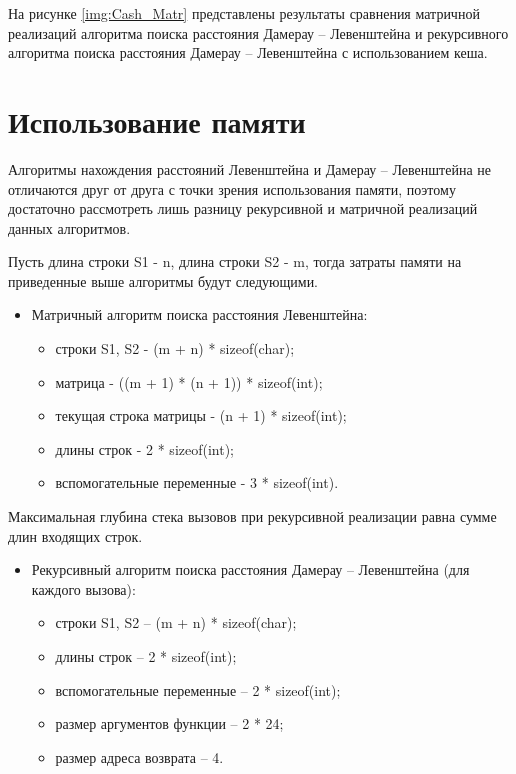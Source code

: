 
\FloatBarrier

На рисунке \ref{img:Cash_Matr} представлены результаты сравнения матричной реализаций алгоритма поиска расстояния Дамерау -- Левенштейна и рекурсивного алгоритма поиска расстояния Дамерау -- Левенштейна с использованием кеша.


\FloatBarrier
 
\section{Использование памяти}

Алгоритмы нахождения расстояний Левенштейна и Дамерау -- Левенштейна не отличаются друг от друга с точки зрения использования памяти, поэтому достаточно рассмотреть лишь разницу рекурсивной и матричной реализаций данных алгоритмов.

Пусть длина строки S1 - n, длина строки S2 - m, тогда затраты памяти на приведенные выше алгоритмы будут следующими.
\begin{itemize}
	\item Матричный алгоритм поиска расстояния Левенштейна:\begin{itemize}
		\item строки S1, S2 - (m + n) * sizeof(char);
		\item матрица - ((m + 1) * (n + 1)) * sizeof(int);
		\item текущая строка матрицы - (n + 1) * sizeof(int);
		\item длины строк - 2 * sizeof(int);
		\item вспомогательные переменные -  3 * sizeof(int).
	\end{itemize}
\end{itemize}

Максимальная глубина стека вызовов при рекурсивной реализации равна сумме длин входящих строк.

\begin{itemize}
	\item Рекурсивный алгоритм поиска расстояния Дамерау -- Левенштейна (для каждого вызова):\begin{itemize}
		\item строки S1, S2 -- (m + n) * sizeof(char);
		\item длины строк -- 2 * sizeof(int);
		\item вспомогательные переменные --  2 * sizeof(int);
		\item размер аргументов функции -- 2 * 24;
		\item размер адреса возврата -- 4.
	\end{itemize}
\end{itemize}
	
